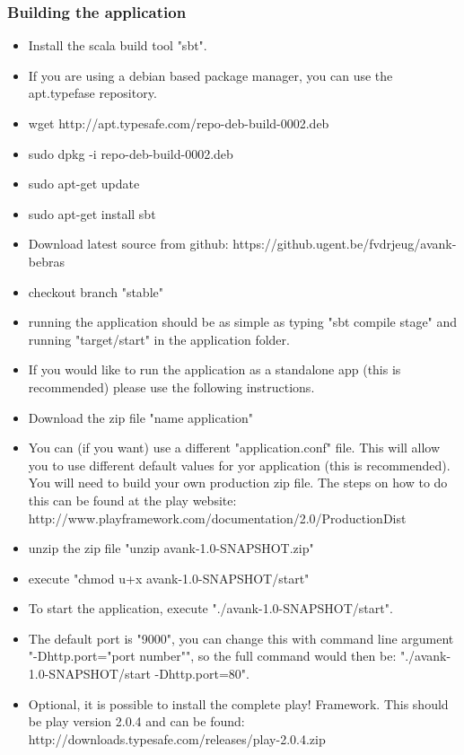 \documentclass[11pt]{article}
\begin{document}
\subsubsection{Building the application}
\begin{itemize}
\item  Install the scala build tool "sbt".
\item  If you are using a debian based package manager, you can use the apt.typefase repository.
\item  wget http://apt.typesafe.com/repo-deb-build-0002.deb
\item  sudo dpkg -i repo-deb-build-0002.deb
\item  sudo apt-get update
\item  sudo apt-get install sbt
\item  Download latest source from github: https://github.ugent.be/fvdrjeug/avank-bebras
\item  checkout branch "stable"
\item  running the application should be as simple as typing "sbt compile stage" and running "target/start" in the application folder.

\item  If you would like to run the application as a standalone app (this is recommended) please use the following instructions.
\item  Download the zip file "name application"
\item  You can (if you want) use a different "application.conf" file. This will allow you to use different default values for yor application (this is recommended).
       You will need to build your own production zip file. The steps on how to do this can be found at the play website: http://www.playframework.com/documentation/2.0/ProductionDist
\item  unzip the zip file "unzip avank-1.0-SNAPSHOT.zip"
\item  execute "chmod u+x avank-1.0-SNAPSHOT/start"
\item  To start the application, execute "./avank-1.0-SNAPSHOT/start".
\item  The default port is "9000", you can change this with command line argument "-Dhttp.port="port number"", so the full command would then be: "./avank-1.0-SNAPSHOT/start -Dhttp.port=80".
      
\item  Optional, it is possible to install the complete play! Framework. This should be play version 2.0.4 and can be found: http://downloads.typesafe.com/releases/play-2.0.4.zip
\end{itemize}
\end{document}
